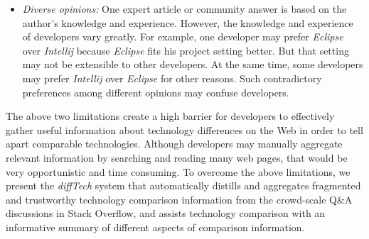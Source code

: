 \begin{itemize}[leftmargin=*]
	\item \textit{Diverse opinions:} One expert article or community answer is based on the author's knowledge and experience. %
	However, the knowledge and experience of developers vary greatly.
	For example, one developer may prefer \textit{Eclipse} over \textit{Intellij} because \textit{Eclipse} fits his project setting better.
	But that setting may not be extensible to other developers.
	At the same time, some developers may prefer \textit{Intellij} over \textit{Eclipse} for other reasons.
	Such contradictory preferences among different opinions may confuse developers. 
	
\end{itemize}


The above two limitations create a high barrier for developers to effectively gather useful information about technology differences on the Web in order to tell apart comparable technologies.
Although developers may manually aggregate relevant information by searching and reading many web pages, that would be very opportunistic and time consuming.
To overcome the above limitations, we present the \textit{diffTech} system that automatically distills and aggregates fragmented and trustworthy technology comparison information from the crowd-scale Q\&A discussions in Stack Overflow, and assists technology comparison with an informative summary of different aspects of comparison information.

